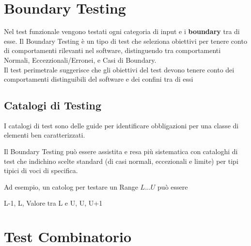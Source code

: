 \section{Boundary Testing}
Nel test funzionale vengono testati ogni categoria di input e i \textbf{boundary} tra di esse.
Il Boundary Testing è un tipo di test che seleziona obiettivi per tenere conto di comportamenti 
rilevanti nel software, distinguendo tra comportamenti Normali, Eccezzionali/Erronei, e Casi di Boundary.
\\Il test perimetrale suggerisce che gli obiettivi del test devono tenere conto dei comportamenti distinguibili del software e dei confini tra di essi

\subsection*{Catalogi di Testing}
I catalogi di test sono delle guide per identificare obbligazioni per una classe di elementi ben caratterizzati.

Il Boundary Testing può essere assistita e resa più sistematica con cataloghi di test che indichino scelte standard (di casi normali, eccezionali e limite) per tipi tipici di voci di specifica.

Ad esempio, un catolog per testare un Range $L ... U$ può essere
\begin{center}
    L-1, L, Valore tra L e U, U, U+1
\end{center}




\section{Test Combinatorio}